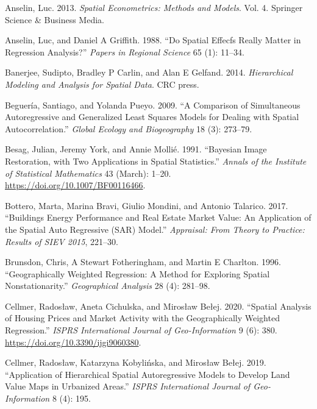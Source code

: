 \documentclass[
  default,
]{sn-jnl}
\newlength{\cslhangindent}
\newenvironment{CSLReferences}[2] %
 {\begin{list}{}{%
  \setlength{\itemindent}{0pt}
  \setlength{\leftmargin}{0pt}
  \setlength{\parsep}{0pt}
  \ifodd #1
   \setlength{\leftmargin}{\cslhangindent}
   \setlength{\itemindent}{-1\cslhangindent}
  \fi
  \setlength{\itemsep}{#2\baselineskip}}}
 {\end{list}}
\begin{document}
\label{refs}
\begin{CSLReferences}{1}{0}
Anselin, Luc. 2013. \emph{Spatial Econometrics: Methods and Models}.
Vol. 4. Springer Science \& Business Media.

Anselin, Luc, and Daniel A Griffith. 1988. {``Do Spatial Effecfs Really
Matter in Regression Analysis?''} \emph{Papers in Regional Science} 65
(1): 11--34.

Banerjee, Sudipto, Bradley P Carlin, and Alan E Gelfand. 2014.
\emph{Hierarchical Modeling and Analysis for Spatial Data}. CRC press.

Beguería, Santiago, and Yolanda Pueyo. 2009. {``A Comparison of
Simultaneous Autoregressive and Generalized Least Squares Models for
Dealing with Spatial Autocorrelation.''} \emph{Global Ecology and
Biogeography} 18 (3): 273--79.

Besag, Julian, Jeremy York, and Annie Mollié. 1991. {``Bayesian Image
Restoration, with Two Applications in Spatial Statistics.''}
\emph{Annals of the Institute of Statistical Mathematics} 43 (March):
1--20. \url{https://doi.org/10.1007/BF00116466}.

Bottero, Marta, Marina Bravi, Giulio Mondini, and Antonio Talarico.
2017. {``Buildings Energy Performance and Real Estate Market Value: An
Application of the Spatial Auto Regressive (SAR) Model.''}
\emph{Appraisal: From Theory to Practice: Results of SIEV 2015},
221--30.

Brunsdon, Chris, A Stewart Fotheringham, and Martin E Charlton. 1996.
{``Geographically Weighted Regression: A Method for Exploring Spatial
Nonstationarity.''} \emph{Geographical Analysis} 28 (4): 281--98.

Cellmer, Radosław, Aneta Cichulska, and Mirosław Bełej. 2020. {``Spatial
Analysis of Housing Prices and Market Activity with the Geographically
Weighted Regression.''} \emph{ISPRS International Journal of
Geo-Information} 9 (6): 380. \url{https://doi.org/10.3390/ijgi9060380}.

Cellmer, Radosław, Katarzyna Kobylińska, and Mirosław Bełej. 2019.
{``Application of Hierarchical Spatial Autoregressive Models to Develop
Land Value Maps in Urbanized Areas.''} \emph{ISPRS International Journal
of Geo-Information} 8 (4): 195.


\end{CSLReferences}
\end{document}
